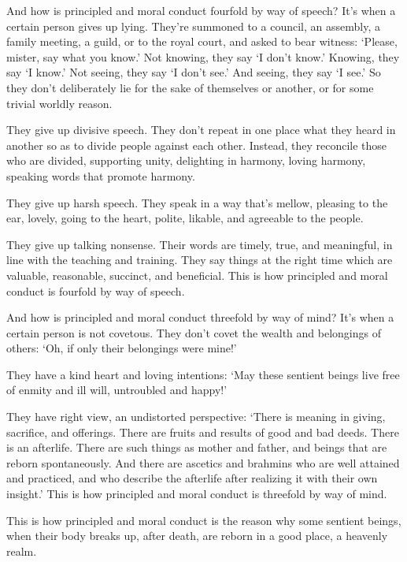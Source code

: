 \documentclass[12pt,openany]{book}%
\begin{document}
And how is principled and moral conduct fourfold by way of speech? It’s when a certain person gives up lying. They’re summoned to a council, an assembly, a family meeting, a guild, or to the royal court, and asked to bear witness: ‘Please, mister, say what you know.’ Not knowing, they say ‘I don’t know.’ Knowing, they say ‘I know.’ Not seeing, they say ‘I don’t see.’ And seeing, they say ‘I see.’ So they don’t deliberately lie for the sake of themselves or another, or for some trivial worldly reason. 

They give up divisive speech. They don’t repeat in one place what they heard in another so as to divide people against each other. Instead, they reconcile those who are divided, supporting unity, delighting in harmony, loving harmony, speaking words that promote harmony. 

They give up harsh speech. They speak in a way that’s mellow, pleasing to the ear, lovely, going to the heart, polite, likable, and agreeable to the people. 

They give up talking nonsense. Their words are timely, true, and meaningful, in line with the teaching and training. They say things at the right time which are valuable, reasonable, succinct, and beneficial. This is how principled and moral conduct is fourfold by way of speech. 

And how is principled and moral conduct threefold by way of mind? It's when a certain person is not covetous. They don’t covet the wealth and belongings of others: ‘Oh, if only their belongings were mine!’ 

They have a kind heart and loving intentions: ‘May these sentient beings live free of enmity and ill will, untroubled and happy!’ 

They have right view, an undistorted perspective: ‘There is meaning in giving, sacrifice, and offerings. There are fruits and results of good and bad deeds. There is an afterlife. There are such things as mother and father, and beings that are reborn spontaneously. And there are ascetics and brahmins who are well attained and practiced, and who describe the afterlife after realizing it with their own insight.’ This is how principled and moral conduct is threefold by way of mind. 

This is how principled and moral conduct is the reason why some sentient beings, when their body breaks up, after death, are reborn in a good place, a heavenly realm. 
\end{document}
